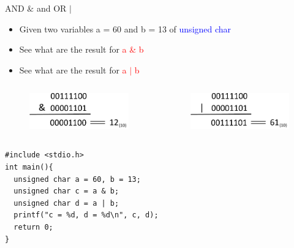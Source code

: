 \begin{frame}[fragile]{AND $\&$ and OR $|$}
\begin{itemize}
	\item {Given two variables a = 60 and b = 13 of \textcolor{blue}{unsigned char}}
	\item {See what are the result for \textcolor{red}{a \& b}}
	\item {See what are the result for \textcolor{red}{a $|$ b}}
\end{itemize}
\begin{columns}
\begin{column}{0.5\linewidth}
\begin{figure}
\begin{center}
	\includegraphics[width=0.8\linewidth]{figs/and.pdf}
\end{center}
\end{figure}
\end{column}
\begin{column}{0.5\linewidth}
\begin{figure}
\begin{center}
	\includegraphics[width=0.8\linewidth]{figs/or.pdf}
\end{center}
\end{figure}
\end{column}
\end{columns}
\vspace{0.15in}
\begin{center}
\begin{lstlisting}[linewidth=0.7\linewidth]
#include <stdio.h>
int main(){
  unsigned char a = 60, b = 13;
  unsigned char c = a & b;
  unsigned char d = a | b;
  printf("c = %d, d = %d\n", c, d);
  return 0;
}
\end{lstlisting}
\end{center}
\end{frame}


